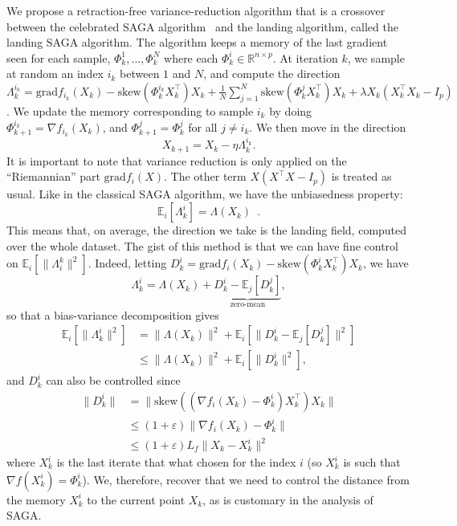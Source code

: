 \documentclass[twoside,11pt]{article}
\newcommand{\grad}{{\mathrm{grad}}}
\newcommand{\sk}{{\mathrm{skew}}}
\newcommand{\finalrevision}[1]{{#1}}
\begin{document}
We propose a retraction-free variance-reduction algorithm that is a crossover between the celebrated SAGA algorithm~\citep{defazio2014saga} and the landing algorithm, called the landing SAGA algorithm.
The algorithm keeps a memory of the last gradient seen for each sample, $\Phi^1_k, \dots, \Phi_k^N$ where each $\Phi_k^i \in \mathbb{R}^{n\times p}$. At iteration $k$, we sample at random an index $i_k$ between $1$ and $N$, and compute the direction
$\Lambda^{i_k}_k = \grad f_{i_k}(X_k) - \sk(\Phi_k^{i_k}X_k^\top)X_k + \frac1N \sum_{j=1}^N\sk(\Phi_k^j X_k^\top)X_k+\lambda X_k(X_k^\top X_k - I_p)$. We update the memory corresponding to sample $i_k$ by doing $\Phi_{k+1}^{i_k} = \nabla f_{i_k}(X_k)$, and $\Phi_{k+1}^j = \Phi_{k}^j$ for all $j\neq i_k$. We then move in the direction
$$
X_{k+1} = X_k -\eta \Lambda_k^{i_k}.
$$
It is important to note that variance reduction is only applied on the ``Riemannian'' part $\grad f_i(X)$. The other term $X(X^\top X- I_p)$ is treated as usual. Like in the classical SAGA algorithm, we have the unbiasedness property:
$$
\mathbb{E}_i[\Lambda_k^i] = \Lambda(X_k)\enspace.
$$
This means that, on average, the direction we take is the landing field, computed over the whole dataset.
The gist of this method is that we can have fine control on $\mathbb{E}_i[\|\Lambda^k_i\|^2]$. Indeed, letting $D_k^i = \grad f_i(X_k) -\sk(\Phi_k^iX_k^\top)X_k$, we have
\finalrevision{
\begin{equation}
\Lambda_k^i=\Lambda(X_k) + \underbrace{D_k^i - \mathbb{E}_j[D_k^j]}_{\text{zero-mean}} ,
\end{equation}
so that a bias-variance decomposition gives}
\begin{align}
  \mathbb{E}_i[\|\Lambda^i_k\|^2] &= \|\Lambda(X_k)\|^2 + \mathbb{E}_i[\|D_k^i - \mathbb{E}_j[D_k^j]\|^2]\\
  &\leq \|\Lambda(X_k)\|^2 + \mathbb{E}_i[\|D_k^i\|^2],
\end{align}
and $D_k^i$ can also be controlled since
\begin{align}
     \|D_k^i\|&= \|\sk((\nabla f_i(X_k) - \Phi_k^i)X_k^\top)X_k\| \\
     &\leq(1+\varepsilon)\|\nabla f_i(X_k) - \Phi_k^i\|\\
     &\leq(1+\varepsilon) L_f \|X_k - X_k^i\|^2
\end{align}
where $X_k^i$ is the last iterate that what chosen for the index $i$ (so $X_k^i$ is such that $\nabla f(X_k^i) = \Phi_k^i$). We, therefore, recover that we need to control the distance from the memory $X_k^i$ to the current point $X_k$, as is customary in the analysis of SAGA.
\end{document}
